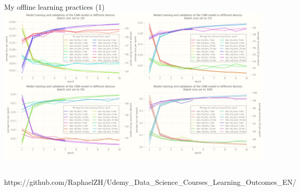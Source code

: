 \documentclass{beamer}
\begin{document}
	\begin{frame}[fragile]{My offline learning practices (1)}
		\centering\includegraphics[width=.76\textwidth]{images/deep_learning_0.png}
		\vspace{-.75em}
		\begin{columns}
			\normalfont\footnotesize{https://github.com/RaphaelZH/Udemy\_Data\_Science\_Courses\_Learning\_Outcomes\_EN/}
		\end{columns}
	\end{frame}
	
\end{document}
